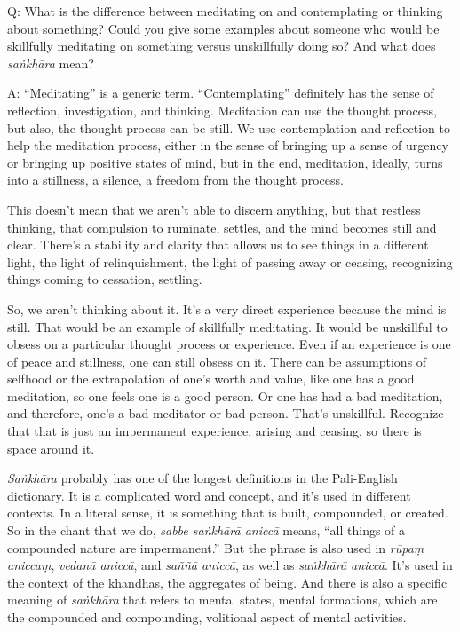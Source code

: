 \qaspace
Q: What is the difference between meditating on and contemplating or
thinking about something? Could you give some examples about someone who
would be skillfully meditating on something versus unskillfully doing
so? And what does \emph{saṅkhāra} mean?

\qaspace
A: “Meditating” is a generic term. “Contemplating” definitely has the
sense of reflection, investigation, and thinking. Meditation can use the
thought process, but also, the thought process can be still. We use
contemplation and reflection to help the meditation process, either in
the sense of bringing up a sense of urgency or bringing up positive
states of mind, but in the end, meditation, ideally, turns into a
stillness, a silence, a freedom from the thought process.

This doesn’t mean that we aren’t able to discern anything, but that
restless thinking, that compulsion to ruminate, settles, and the mind
becomes still and clear. There’s a stability and clarity that allows us
to see things in a different light, the light of relinquishment, the
light of passing away or ceasing, recognizing things coming to
cessation, settling.

So, we aren’t thinking about it. It’s a very direct experience because
the mind is still. That would be an example of skillfully meditating. It
would be unskillful to obsess on a particular thought process or
experience. Even if an experience is one of peace and stillness, one can
still obsess on it. There can be assumptions of selfhood or the
extrapolation of one’s worth and value, like one has a good meditation,
so one feels one is a good person. Or one has had a bad meditation, and
therefore, one’s a bad meditator or bad person. That’s unskillful.
Recognize that that is just an impermanent experience, arising and
ceasing, so there is space around it.

\emph{Saṅkhāra} probably has one of the longest definitions in the
Pali-English dictionary. It is a complicated word and concept, and it’s
used in different contexts. In a literal sense, it is something that is
built, compounded, or created. So in the chant that we do, \emph{sabbe
saṅkhārā aniccā} means, “all things of a compounded nature are
impermanent.” But the phrase is also used in \emph{rūpaṃ aniccaṃ},
\emph{vedanā aniccā}, and \emph{saññā aniccā}, as well as \emph{saṅkhārā
aniccā}. It’s used in the context of the khandhas, the aggregates of
being. And there is also a specific meaning of \emph{saṅkhāra} that
refers to mental states, mental formations, which are the compounded and
compounding, volitional aspect of mental activities.

